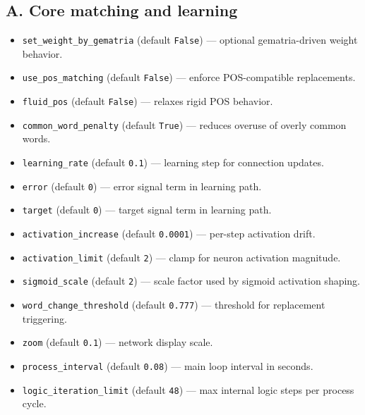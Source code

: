 \documentclass[11pt,a4paper]{article}
\begin{document}
\subsection*{A. Core matching and learning}
\begin{itemize}
  \item \texttt{set\_weight\_by\_gematria} (default \texttt{False}) --- optional gematria-driven weight behavior.
  \item \texttt{use\_pos\_matching} (default \texttt{False}) --- enforce POS-compatible replacements.
  \item \texttt{fluid\_pos} (default \texttt{False}) --- relaxes rigid POS behavior.
  \item \texttt{common\_word\_penalty} (default \texttt{True}) --- reduces overuse of overly common words.
  \item \texttt{learning\_rate} (default \texttt{0.1}) --- learning step for connection updates.
  \item \texttt{error} (default \texttt{0}) --- error signal term in learning path.
  \item \texttt{target} (default \texttt{0}) --- target signal term in learning path.
  \item \texttt{activation\_increase} (default \texttt{0.0001}) --- per-step activation drift.
  \item \texttt{activation\_limit} (default \texttt{2}) --- clamp for neuron activation magnitude.
  \item \texttt{sigmoid\_scale} (default \texttt{2}) --- scale factor used by sigmoid activation shaping.
  \item \texttt{word\_change\_threshold} (default \texttt{0.777}) --- threshold for replacement triggering.
  \item \texttt{zoom} (default \texttt{0.1}) --- network display scale.
  \item \texttt{process\_interval} (default \texttt{0.08}) --- main loop interval in seconds.
  \item \texttt{logic\_iteration\_limit} (default \texttt{48}) --- max internal logic steps per process cycle.
\end{itemize}
\end{document}
